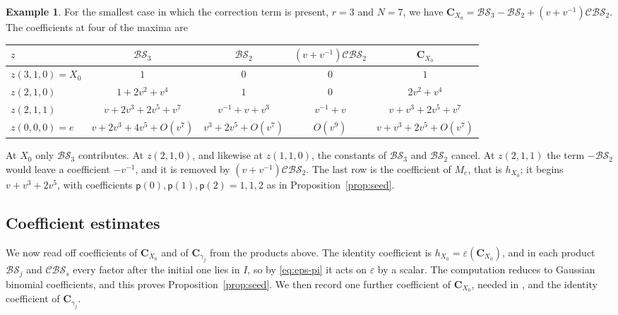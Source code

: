 \documentclass[11pt,a4paper,reqno]{amsart}
\numberwithin{equation}{section}
\theoremstyle{definition}
\newtheorem{example}[theorem]{Example}
\theoremstyle{remark}
\theoremstyle{plain}
\newcommand{\C}{\mathbf C}
\newcommand{\eps}{\varepsilon}
\newcommand{\Part}{\mathsf p}
\newcommand{\R}{\mathcal {BS}}
\newcommand{\V}{\mathcal {CBS}}
\begin{document}
\begin{example}\label{ex:canonical-lift}
For the smallest case in which the correction term is present, $r=3$ and $N=7$, we have
$\C_{X_0}=\R_3-\R_2+(v+v^{-1})\V_2$. The coefficients at four of the maxima are
\begin{center}
\renewcommand{\arraystretch}{1.2}
\begin{tabular}{@{}lcccc@{}}
\toprule
$z$ & $\R_3$ & $\R_2$ & $(v+v^{-1})\V_2$ & $\C_{X_0}$\\
\midrule
$z(3,1,0)=X_0$ & $1$ & $0$ & $0$ & $1$\\
$z(2,1,0)$ & $1+2v^2+v^4$ & $1$ & $0$ & $2v^2+v^4$\\
$z(2,1,1)$ & $v+2v^3+2v^5+v^7$ & $v^{-1}+v+v^3$ & $v^{-1}+v$ & $v+v^3+2v^5+v^7$\\
$z(0,0,0)=e$ & $v+2v^3+4v^5+O(v^7)$ & $v^3+2v^5+O(v^7)$ & $O(v^9)$ & $v+v^3+2v^5+O(v^7)$\\
\bottomrule
\end{tabular}
\end{center}
At $X_0$ only $\R_3$ contributes. At $z(2,1,0)$, and likewise at $z(1,1,0)$, the constants of $\R_3$ and $\R_2$ cancel.
At $z(2,1,1)$ the term $-\R_2$ would leave a coefficient $-v^{-1}$, and it is removed by $(v+v^{-1})\V_2$.
The last row is the coefficient of $M_e$, that is $h_{X_0}$; it begins $v+v^3+2v^5$, with coefficients
$\Part(0),\Part(1),\Part(2)=1,1,2$ as in Proposition~\ref{prop:seed}.
\end{example}

\subsection{Coefficient estimates}\label{sec:seedproof}

We now read off coefficients of $\C_{X_0}$ and of $\C_{\gamma_j}$ from the products above. The identity coefficient is
$h_{X_0}=\eps(\C_{X_0})$, and in each product $\R_j$ and $\V_s$ every factor after the initial one lies in $I$, so by
\eqref{eq:eps-pi} it acts on $\eps$ by a scalar. The computation reduces to Gaussian binomial coefficients, and this
proves Proposition~\ref{prop:seed}. We then record one further coefficient of $\C_{X_0}$, needed in , and the identity coefficient of $\C_{\gamma_j}$.
\end{document}
